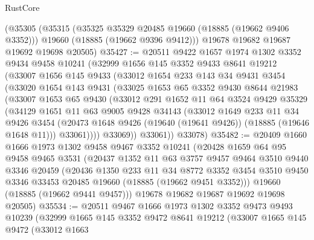 \begin{lexlean}{RustCore}
\begin{coremodule}
    (@35305
      (@35315
        (@35325 @35329 @20485 @19660 (@18885 (@19662 @9406 @3352)))
        @19660
        (@18885 (@19662 @9396 @9412)))
      @19678
      @19682
      @19687
      @19692
      @19698
      @20505)
@35427 := @20511
    @9422
    @1657
    @1974
    @1302
    @3352
    @9434
    @9458
    @10241
    (@32999
      @1656
      @145
      @3352
      @9433
      @8641
      @19212
      (@33007
        @1656
        @145
        @9433
        (@33012
          @1654
          @233
          @143
          @34
          @9431
          @3454
          (@33020
            @1654
            @143
            @9431
            (@33025
              @1653
              @65
              @3352
              @9430
              @8644
              @21983
              (@33007
                @1653
                @65
                @9430
                (@33012
                  @291
                  @1652
                  @11
                  @64
                  @3524
                  @9429
                  @35329
                  (@34129
                    @1651
                    @11
                    @63
                    @9005
                    @9428
                    @34143
                    (@33012
                      @1649
                      @233
                      @11
                      @34
                      @9426
                      @3454
                      (@20473 @1648 @9426 (@19640 (@19641 @9426)) (@18885 (@19646 @1648 @11)))
                      @33061))))
              @33069))
          @33061))
      @33078)
@35482 := @20409
    @1660
    @1666
    @1973
    @1302
    @9458
    @9467
    @3352
    @10241
    (@20428
      @1659
      @64
      @95
      @9458
      @9465
      @3531
      (@20437
        @1352
        @11
        @63
        @3757
        @9457
        @9464
        @3510
        @9440
        @3346
        @20459
        (@20436
          @1350
          @233
          @11
          @34
          @8772
          @3352
          @3454
          @3510
          @9450
          @3346
          @33453
          @20485
          @19660
          (@18885 (@19662 @9451 @3352)))
        @19660
        (@18885 (@19662 @9441 @9457)))
      @19678
      @19682
      @19687
      @19692
      @19698
      @20505)
@35534 := @20511
    @9467
    @1666
    @1973
    @1302
    @3352
    @9473
    @9493
    @10239
    (@32999
      @1665
      @145
      @3352
      @9472
      @8641
      @19212
      (@33007
        @1665
        @145
        @9472
        (@33012
          @1663

\end{coremodule}
\end{lexlean}
